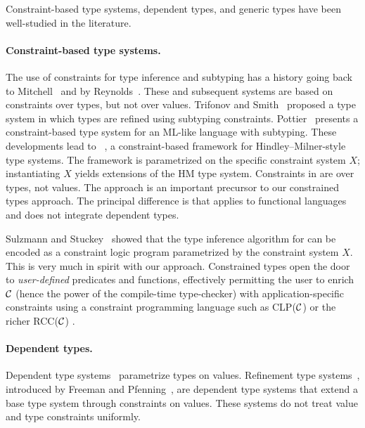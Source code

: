 Constraint-based type systems, dependent types, and generic types
have been well-studied in the literature.

\paragraph{Constraint-based type systems.}

The use of constraints for type inference and subtyping has a history
going back to Mitchell~\cite{mitchell84} and by
Reynolds~\cite{reynolds85}.  These and subsequent systems are based on
constraints over types, but not over values.  Trifonov and
Smith~\cite{trifonov96} proposed a type system in which types are
refined using subtyping constraints.
Pottier~\cite{pottier96simplifying} presents a constraint-based type
system for an ML-like language with subtyping.  These developments
lead to \hmx~\cite{sulzmann97type}, a constraint-based framework for
Hindley--Milner-style type systems.  The framework is parametrized on
the specific constraint system $X$; instantiating $X$ yields
extensions of the HM type system.  Constraints in \hmx{} are over
types, not values. The \hmx{} approach is an important precursor to
our constrained types approach. The principal difference is that
\hmx{} applies to functional languages and does not integrate
dependent types.

%
Sulzmann and Stuckey~\cite{sulzmann-hmx-clpx} showed that the
type inference algorithm for \hmx can be encoded as a
constraint logic program parametrized by the constraint system
$X$. This is very much in spirit with our approach.
Constrained types open the door to {\em user-defined}
predicates and functions, effectively permitting the user to enrich
$\cal C$ (hence the power of the compile-time type-checker)
with application-specific constraints using a constraint
programming language such as CLP($\cal C$) \cite{clp} or the richer
RCC($\cal C$) \cite{DBLP:conf/fsttcs/JagadeesanNS05}.

\paragraph{Dependent types.}

Dependent type
systems~\cite{xi99dependent,calc-constructions,epigram,cayenne}
param\-etrize types on values.  Refinement type
systems~\cite{refinement-types,conditional-types,jones94,sized-types,flanagan-popl06,flanagan-fool06,liquid-types},
introduced by Freeman and Pfenning~\cite{refinement-types}, are dependent type
systems that extend a base type system through constraints on values.  These
systems do not treat value and type constraints uniformly.

